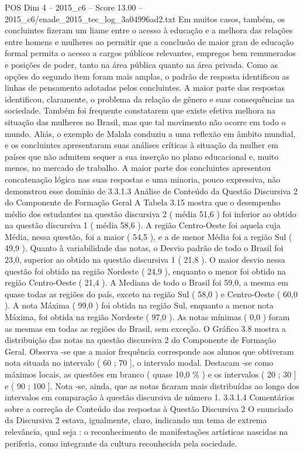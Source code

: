 \begin{textsample}{POS Dim 4 – 2015\_c6 – Score 13.00 – 2015\_c6/enade\_2015\_tec\_log\_3a04996ad2.txt}
Em muitos casos, também, os concluintes fizeram um liame entre o acesso à educação e a melhora das relações entre homens e mulheres ao permitir que a conclusão de maior grau de educação formal permita o acesso a cargos públicos relevantes, empregos bem remunerados e posições de poder, tanto na área pública quanto na área privada.
Como as opções do segundo item foram mais amplas, o padrão de resposta identificou as linhas de pensamento adotadas pelos concluintes.
A maior parte das respostas identificou, claramente, o problema da relação de gênero e suas consequências na sociedade.
Também foi frequente constatarem que existe efetiva melhora na situação das mulheres no Brasil, mas que tal movimento não ocorre em todo o mundo.
Aliás, o exemplo de Malala conduziu a uma reflexão em âmbito mundial, e os concluintes apresentaram suas análises críticas à situação da mulher em países que não admitem sequer a sua inserção no plano educacional e, muito menos, no mercado de trabalho.
A maior parte dos concluintes apresentou concatenação lógica nas suas respostas e uma minoria, pouco expressiva, não demonstrou esse domínio de 3.3.1.3 Análise de Conteúdo da Questão Discursiva 2 do Componente de Formação Geral A Tabela 3.15 mostra que o desempenho médio dos estudantes na questão discursiva 2 ( média 51,6 ) foi inferior ao obtido na questão discursiva 1 ( média 58,6 ).
A região Centro-Oeste foi aquela cuja Média, nessa questão, foi a maior ( 54,5 ), e a de menor Média foi a região Sul ( 49,9 ).
Quanto à variabilidade das notas, o Desvio padrão de todo o Brasil foi 23,0, superior ao obtido na questão discursiva 1 ( 21,8 ).
O maior desvio nessa questão foi obtido na região Nordeste ( 24,9 ), enquanto o menor foi obtido na região Centro-Oeste ( 21,4 ).
A Mediana de todo o Brasil foi 59,0, a mesma em quase todas as regiões do país, exceto na região Sul ( 58,0 ) e Centro-Oeste ( 60,0 ).
A nota Máxima ( 99,0 ) foi obtida na região Sul, enquanto a menor nota Máxima, foi obtida na região Nordeste ( 97,0 ).
As notas mínimas ( 0,0 ) foram as mesmas em todas as regiões do Brasil, sem exceção.
O Gráfico 3.8 mostra a distribuição das notas na questão discursiva 2 do Componente de Formação Geral.
Observa -se que a maior frequência corresponde aos alunos que obtiveram nota situada no intervalo ( 60 ; 70 ], o intervalo modal.
Destacam -se como máximos locais, as questões em branco ( quase 10,0 \% ) e os intervalos ( 20 ; 30 ] e ( 90 ; 100 ].
Nota -se, ainda, que as notas ficaram mais distribuídas ao longo dos intervalos em comparação à questão discursiva de número 1. 3.3.1.4 Comentários sobre a correção de Conteúdo das respostas à Questão Discursiva 2 O enunciado da Discursiva 2 estava, igualmente, claro, indicando um tema de extrema relevância, qual seja : o reconhecimento de manifestações artísticas nascidas na periferia, como integrante da cultura reconhecida pela sociedade.

\end{textsample}
